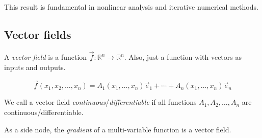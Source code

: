 This result is fundamental in nonlinear analysis and iterative numerical methods.

\subsection{Vector fields}

A \emph{vector field} is a function \(\vec{f}: \mathbb{R}^n \to \mathbb{R}^n\). Also, just a 
function with vectors as inputs and outputs.

\[
\vec{f}(x_1, x_2, \dots, x_n) = A_1(x_1, \dots, x_n)\vec{e}_1 + \cdots + A_n(x_1, \dots, x_n)\vec{e}_n
\]

We call a vector field \emph{continuous}/\emph{differentiable} if all functions 
\(A_1, A_2, \dots, A_n\) are continuous/differentiable.
\vspace{\baselineskip}

As a side node, the \emph{gradient} of a multi-variable function is a vector field.



